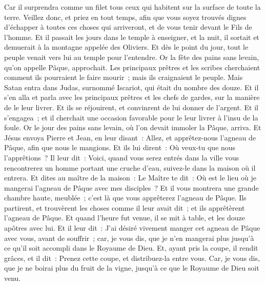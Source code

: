 \begin{multicols}{2}
Car il surprendra comme un filet tous ceux qui habitent sur la surface de toute la terre.
Veillez donc, et priez en tout temps, afin que vous soyez trouvés dignes d'échapper à toutes ces choses qui arriveront, et de vous tenir devant le Fils de l'homme.
Et il passait les jours dans le temple à enseigner, et la nuit, il sortait et demuerait à la montagne appelée des Oliviers.
Et dès le point du jour, tout le peuple venait vers lui au temple pour l'entendre.
\VerseOne{}Or la fête des pains sans levain, qu'on appelle Pâque, approchait.
Les principaux prêtres et les scribes cherchaient comment ils pourraient le faire mourir~; mais ils craignaient le peuple.
Mais Satan entra dans Judas, surnommé Iscariot, qui était du nombre des douze.
Et il s'en alla et parla avec les principaux prêtres et les chefs de gardes, sur la manière de le leur livrer.
Et ils se réjouirent, et convinrent de lui donner de l'argent.
Et il s'engagea~; et il cherchait une occasion favorable pour le leur livrer à l'insu de la foule.
Or le jour des pains sans levain, où l'on devait immoler la Pâque, arriva.
Et Jésus envoya Pierre et Jean, en leur disant~: Allez, et apprêtez-nous l'agneau de Pâque, afin que nous le mangions.
Et ils lui dirent~: Où veux-tu que nous l'apprêtions~?
Il leur dit~: Voici, quand vous serez entrés dans la ville vous rencontrerez un homme portant une cruche d'eau, suivez-le dans la maison où il entrera.
Et dites au maître de la maison~: Le Maître te dit~: Où est le lieu où je mangerai l'agneau de Pâque avec mes disciples~?
Et il vous montrera une grande chambre haute, meublée~; c'est là que vous apprêterez l'agneau de Pâque.
Ils partirent, et trouvèrent les choses comme il leur avait dit~; et ils apprêtèrent l'agneau de Pâque.
Et quand l'heure fut venue, il se mit à table, et les douze apôtres avec lui.
Et il leur dit~: J'ai désiré vivement manger cet agneau de Pâque avec vous, avant de souffrir~;
car, je vous dis, que je n'en mangerai plus jusqu'à ce qu'il soit accompli dans le Royaume de Dieu.
Et, ayant pris la coupe, il rendit grâces, et il dit~: Prenez cette coupe, et distribuez-la entre vous.
Car, je vous dis, que je ne boirai plus du fruit de la vigne, jusqu'à ce que le Royaume de Dieu soit venu.

\end{multicols}
